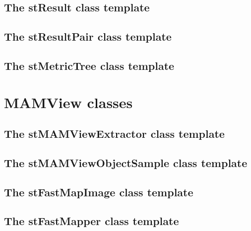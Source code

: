 \subsection{The stResult class template}

\subsection{The stResultPair class template}

\subsection{The stMetricTree class template}

\section{MAMView classes}

\subsection{The stMAMViewExtractor class template}

\subsection{The stMAMViewObjectSample class template}

\subsection{The stFastMapImage class template}

\subsection{The stFastMapper class template}

